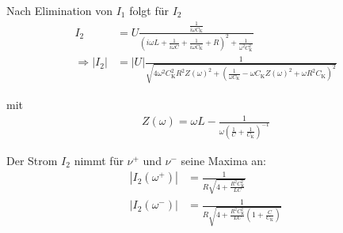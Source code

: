 Nach Elimination von $I_{1}$ folgt für $I_{2}$ 
\begin{align}
    I_{2} &=U \frac{\frac{1}{i \omega C_\text{K}}}{\left(i \omega L+\frac{1}{i \omega C}+\frac{1}{i \omega C_\text{K}}+R\right)^{2}+\frac{1}{\omega^{2} C_\text{K}^{2}}} \label{eq:strom2} \\
    \Rightarrow\left|I_{2}\right| &=\lvert U\rvert \frac{1}{\sqrt{4 \omega^{2} C_\text{K}^{2} R^{2} Z(\omega)^{2}+\left(\frac{1}{\omega C_\text{K}}-\omega C_\text{K} Z(\omega)^{2}+\omega R^{2} C_\text{K}\right)^{2}}} \label{eq:betrag_strom2}     
\end{align}

mit
\begin{align}
    Z(\omega)=\omega L-\frac{1}{\omega\left(\frac{1}{C}+\frac{1}{C_\text{K}}\right)^{-1}}
\end{align}

Der Strom $I_{2}$ nimmt für $\nu^+$ und $\nu^-$ seine Maxima an:
\begin{align}
    \left|I_{2}\left(\omega^{+}\right)\right| &= \frac{1}{R \sqrt{4+\frac{R^{2} C_\text{K}^{2}}{L C}}} \label{eq:strom2_omegaplus}\\
    \left|I_{2}\left(\omega^{-}\right)\right| &= \frac{1}{R \sqrt{4+\frac{R^{2} C_\text{K}^{2}}{L C}\left(1+\frac{C}{C_\text{K}}\right)}} \label{eq:strom2_omegaminus}
\end{align}
